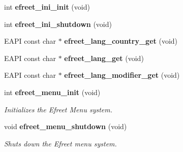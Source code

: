 \begin{CompactItemize}
int {\bf efreet\_\-ini\_\-init} (void)
\item 
int {\bf efreet\_\-ini\_\-shutdown} (void)
\item 
EAPI const char $\ast$ {\bf efreet\_\-lang\_\-country\_\-get} (void)
\item 
EAPI const char $\ast$ {\bf efreet\_\-lang\_\-get} (void)
\item 
EAPI const char $\ast$ {\bf efreet\_\-lang\_\-modifier\_\-get} (void)
\item 
int {\bf efreet\_\-menu\_\-init} (void)
\begin{CompactList}\small\item\em Initializes the Efreet Menu system. \item\end{CompactList}\item 
void {\bf efreet\_\-menu\_\-shutdown} (void)
\begin{CompactList}\small\item\em Shuts down the Efreet menu system. \item\end{CompactList}\end{CompactItemize}
